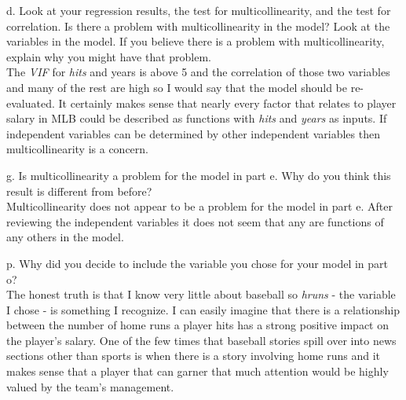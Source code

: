 \begin{description} %
	\item{d.} Look at your regression results, the test for multicollinearity, and the test for correlation. Is there a problem with multicollinearity in the model? Look at the variables in the model. If you believe there is a problem with multicollinearity, explain why you might have that problem.\\
	
	The \emph{VIF} for \emph{hits} and years is above 5 and the correlation of those two variables and many of the rest are high so I would say that the model should be re-evaluated.  It certainly makes sense that nearly every factor that relates to player salary in MLB could be described as functions with \emph{hits} and \emph{years} as inputs.  If independent variables can be determined by other independent variables then multicollinearity is a concern.\\
	
	\item{g.} Is multicollinearity a problem for the model in part e. Why do you think this result is different from before? \\
	
	Multicollinearity does not appear to be a problem for the model in part e.  After reviewing the independent variables it does not seem that any are functions of any others in the model.  \\
	
	\item{p.} Why did you decide to include the variable you chose for your model in part o? \\
	
	The honest truth is that I know very little about baseball so \emph{hruns} - the variable I chose - is something I recognize.  I can easily imagine that there is a relationship between the number of home  runs a player hits has a strong positive impact on the player's salary.  One of the few times that baseball stories spill over into news sections other than sports is when there is a story involving home runs and it makes sense  that a player that can garner that much attention would be highly valued by the team's management. \\
	
\end{description}